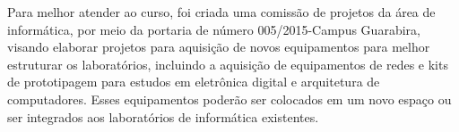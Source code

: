 	Para melhor atender ao curso, foi criada uma comissão de projetos da área de informática, por meio da portaria de número 005/2015-Campus Guarabira, visando elaborar projetos para aquisição de novos equipamentos para melhor estruturar os laboratórios, incluindo a aquisição de equipamentos de redes e kits de prototipagem para estudos em eletrônica digital e arquitetura de computadores. Esses equipamentos poderão ser colocados em um novo espaço ou ser integrados aos laboratórios de informática existentes.




